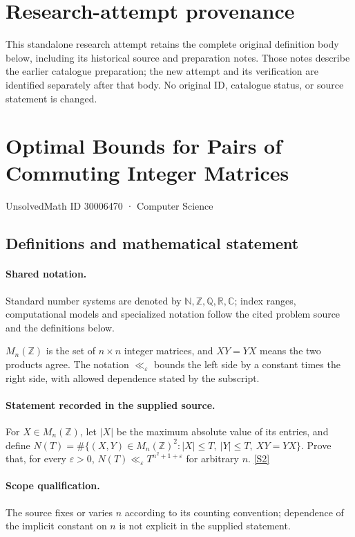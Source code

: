 \documentclass[11pt]{article}
\begin{document}
\section*{Research-attempt provenance}
This standalone research attempt retains the complete original definition body below,
including its historical source and preparation notes. Those notes describe the
earlier catalogue preparation; the new attempt and its verification are identified
separately after that body. No original ID, catalogue status, or source statement is changed.

\section{Optimal Bounds for Pairs of Commuting Integer Matrices}\label{30006470}
{\small UnsolvedMath ID 30006470 · Computer Science}
\subsection{Definitions and mathematical statement}

\paragraph{Shared notation.}Standard number systems are denoted by $\mathbb N,\mathbb Z,\mathbb Q,\mathbb R,\mathbb C$; index ranges, computational models and specialized notation follow the cited problem source and the definitions below.


$M_n(\mathbb Z)$ is the set of $n\times n$ integer matrices, and $XY=YX$ means the two products agree. The notation $\ll_\varepsilon$ bounds the left side by a constant times the right side, with allowed dependence stated by the subscript.
\paragraph{Statement recorded in the supplied source.}
For $X\in M_n(\mathbb{Z})$, let $|X|$ be the maximum absolute value of its entries, and define $N(T)=\#\{(X,Y)\in M_n(\mathbb{Z})^2:|X|\leq T,\ |Y|\leq T,\ XY=YX\}$. Prove that, for every $\varepsilon>0$, $N(T)\ll_\varepsilon T^{n^2+1+\varepsilon}$ for arbitrary $n$. \href{https://doi.org/10.4171/owr/2025/52}{[S2]}
\paragraph{Scope qualification.}
The source fixes or varies $n$ according to its counting convention; dependence of the implicit constant on $n$ is not explicit in the supplied statement.
\end{document}
